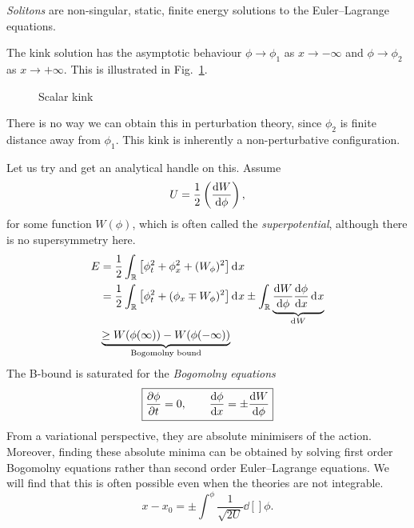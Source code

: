 \begin{definition}[soliton]
  \emph{Solitons} are non-singular, static, finite energy solutions to the Euler--Lagrange equations.
\end{definition}

\begin{example}[Kink]
  The kink solution has the asymptotic behaviour
  $\phi \to \phi_1$ as $x \to - \infty$ and $\phi \to \phi_2$ as $x \to + \infty$.
  This is illustrated in Fig.~\ref{fig:l10f2}.
\begin{figure}[ht]
    \centering
    \caption{Scalar kink}
    \label{fig:l10f2}
\end{figure}

  There is no way we can obtain this in perturbation theory, since $\phi_2$ is finite distance away from $\phi_1$.
  This kink is inherently a non-perturbative configuration.
\end{example}

Let us try and get an analytical handle on this.
Assume
\begin{equation}
  U = \frac{1}{2} \left( \dv{W}{\phi} \right), 
\end{equation}
for some function $W(\phi)$, which is often called the \emph{superpotential}, although there is no supersymmetry here.
\begin{align}
  E &= \frac{1}{2} \int_\mathbb{R} \left[ \phi_t^2 + \phi_x^2 + (W_\phi)^2 \right] \dd[]{x}  \\
    &= \frac{1}{2} \int_\mathbb{R} \left[ \phi_t^2 + (\phi_x \mp W_\phi)^2 \right] \dd[]{x} 
    \pm \int_\mathbb{R} \underbrace{\dv{W}{\phi} \dv{\phi}{x} \dd[]{x}}_{\mathclap{\dd[]{W}}} \label{eq:10-1} \\
    &\underbrace{\geq W(\phi(\infty)) - W(\phi(-\infty))}_{\text{Bogomolny bound}}
\end{align}
The B-bound is saturated for the \emph{Bogomolny equations}
\begin{equation}
  \boxed{\pdv{\phi}{t} = 0, \qquad \dv{\phi}{x} = \pm \dv{W}{\phi}}
\end{equation}
From a variational perspective, they are absolute minimisers of the action.
Moreover, finding these absolute minima can be obtained by solving first order Bogomolny equations rather than second order Euler--Lagrange equations. We will find that this is often possible even when the theories are not integrable.
\begin{equation}
  x - x_0 = \pm \int^\phi \frac{1}{\sqrt{2 U}} \dd[]{\phi}.
\end{equation}

